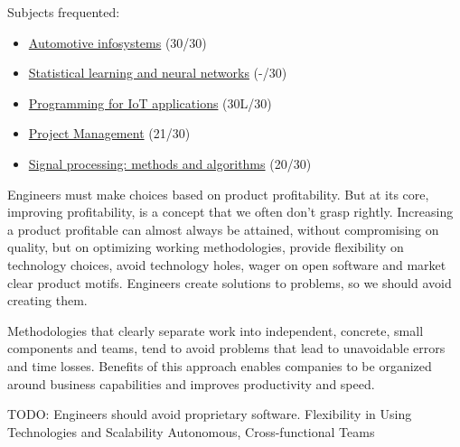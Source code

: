 \documentclass[10pt,a4paper,ragged2e,withhyper]{altacv}
\begin{document}
\begin{paracol}{2}
Subjects frequented:

\small
\begin{itemize}
  \item \href{https://didattica.polito.it/pls/portal30/gap.pkg_guide.viewGap?p_cod_ins=01NIFLO}{Automotive infosystems} (30/30)
  \item \href{https://didattica.polito.it/pls/portal30/gap.pkg_guide.viewGap?p_cod_ins=01SOVBH&p_a_acc=2019&p_header=S}{Statistical learning and neural networks} (-/30)
  \item \href{https://didattica.polito.it/pls/portal30/sviluppo.guide.visualizza?p_cod_ins=01QWRMV&p_a_acc=2018&p_lang=EN}{Programming for IoT applications} (30L/30)
  \item \href{https://didattica.polito.it/pls/portal30/sviluppo.guide.visualizza?p_cod_ins=04IXTPH&p_a_acc=2013}{Project Management} (21/30)
  \item \href{https://didattica.polito.it/pls/portal30/sviluppo.guide.visualizza?p_cod_ins=01QWFBG&p_a_acc=2016&p_lang=EN}{Signal processing: methods and algorithms} (20/30)
\end{itemize}

\divider


\switchcolumn


Engineers must make choices based on product profitability. But at its core, improving profitability, is a concept that we often don't grasp rightly. Increasing a product profitable can almost always be attained, without compromising on quality, but on optimizing working methodologies, provide flexibility on technology choices, avoid technology holes, wager on open software and market clear product motifs. Engineers create solutions to problems, so we should avoid creating them.
 

\iffalse
Methodologies that clearly separate work into independent, concrete, small components and teams, tend to avoid problems that lead to unavoidable errors and time losses. Benefits of this approach enables companies to be organized around business capabilities and improves productivity and speed.

TODO:
Engineers should avoid proprietary software. 
Flexibility in Using Technologies and Scalability
Autonomous, Cross-functional Teams


\end{paracol}
\end{document}
